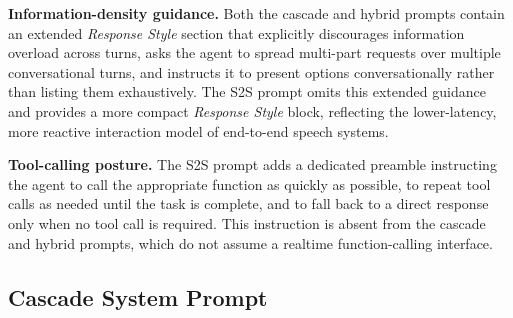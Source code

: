 \textbf{Information-density guidance.}
Both the cascade and hybrid prompts contain an extended \textit{Response Style} section that explicitly discourages information overload across turns, asks the agent to spread multi-part requests over multiple conversational turns, and instructs it to present options conversationally rather than listing them exhaustively.
The S2S prompt omits this extended guidance and provides a more compact \textit{Response Style} block, reflecting the lower-latency, more reactive interaction model of end-to-end speech systems.

\textbf{Tool-calling posture.}
The S2S prompt adds a dedicated preamble instructing the agent to call the appropriate function as quickly as possible, to repeat tool calls as needed until the task is complete, and to fall back to a direct response only when no tool call is required.
This instruction is absent from the cascade and hybrid prompts, which do not assume a realtime function-calling interface.

\bigskip

\subsection{Cascade System Prompt}
\label{app:prompt-cascade}

